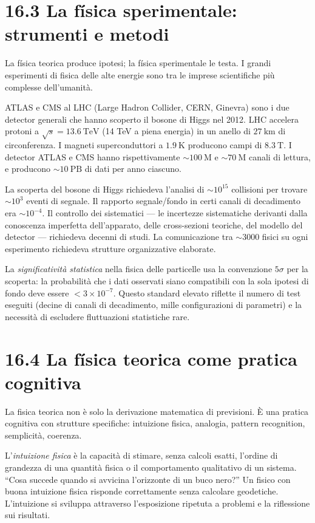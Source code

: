 \documentclass[11.5pt,a4paper,openany]{book}
\theoremstyle{remark}
\begin{document}
\section{16.3 La física sperimentale: strumenti e metodi}

La física teorica produce ipotesi; la física sperimentale le testa. I grandi esperimenti di fisica delle alte energie sono tra le imprese scientifiche più complesse dell'umanità.

ATLAS e CMS al LHC (Large Hadron Collider, CERN, Ginevra) sono i due detector generali che hanno scoperto il bosone di Higgs nel 2012. LHC accelera protoni a $\sqrt{s} = 13.6\ \text{TeV}$ (14 TeV a piena energia) in un anello di $27\ \text{km}$ di circonferenza. I magneti superconduttori a $1.9\ \text{K}$ producono campi di $8.3\ \text{T}$. I detector ATLAS e CMS hanno rispettivamente $\sim 100\ \text{M}$ e $\sim 70\ \text{M}$ canali di lettura, e producono $\sim 10\ \text{PB}$ di dati per anno ciascuno.

La scoperta del bosone di Higgs richiedeva l'analisi di $\sim 10^{15}$ collisioni per trovare $\sim 10^3$ eventi di segnale. Il rapporto segnale/fondo in certi canali di decadimento era $\sim 10^{-4}$. Il controllo dei sistematici --- le incertezze sistematiche derivanti dalla conoscenza imperfetta dell'apparato, delle cross-sezioni teoriche, del modello del detector --- richiedeva decenni di studi. La comunicazione tra $\sim 3000$ fisici su ogni esperimento richiedeva strutture organizzative elaborate.

La \textit{significatività statistica} nella fisica delle particelle usa la convenzione $5\sigma$ per la scoperta: la probabilità che i dati osservati siano compatibili con la sola ipotesi di fondo deve essere $< 3 \times 10^{-7}$. Questo standard elevato riflette il numero di test eseguiti (decine di canali di decadimento, mille configurazioni di parametri) e la necessità di escludere fluttuazioni statistiche rare.

\section{16.4 La física teorica come pratica cognitiva}

La fisica teorica non è solo la derivazione matematica di previsioni. È una pratica cognitiva con strutture specifiche: intuizione fisica, analogia, pattern recognition, semplicità, coerenza.

L'\textit{intuizione fisica} è la capacità di stimare, senza calcoli esatti, l'ordine di grandezza di una quantità fisica o il comportamento qualitativo di un sistema. ``Cosa succede quando si avvicina l'orizzonte di un buco nero?'' Un fisico con buona intuizione fisica risponde correttamente senza calcolare geodetiche. L'intuizione si sviluppa attraverso l'esposizione ripetuta a problemi e la riflessione sui risultati.
\end{document}

